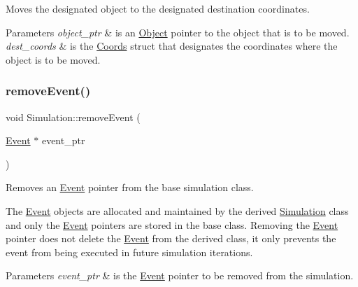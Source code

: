 Moves the designated object to the designated destination coordinates. 


\begin{DoxyParams}{Parameters}
{\em object\+\_\+ptr} & is an \hyperlink{class_object}{Object} pointer to the object that is to be moved. \\
\hline
{\em dest\+\_\+coords} & is the \hyperlink{struct_coords}{Coords} struct that designates the coordinates where the object is to be moved. \\
\hline
\end{DoxyParams}
\mbox{\label{class_simulation_a3a4808231d4760f0ab30ea39b6a67e8c}} 
\subsubsection{\texorpdfstring{remove\+Event()}{removeEvent()}}
{\footnotesize\ttfamily void Simulation\+::remove\+Event (\begin{DoxyParamCaption}\item[{\hyperlink{class_event}{Event} $\ast$}]{event\+\_\+ptr }\end{DoxyParamCaption})\hspace{0.3cm}{\ttfamily [protected]}}



Removes an \hyperlink{class_event}{Event} pointer from the base simulation class. 

The \hyperlink{class_event}{Event} objects are allocated and maintained by the derived \hyperlink{class_simulation}{Simulation} class and only the \hyperlink{class_event}{Event} pointers are stored in the base class. Removing the \hyperlink{class_event}{Event} pointer does not delete the \hyperlink{class_event}{Event} from the derived class, it only prevents the event from being executed in future simulation iterations. 
\begin{DoxyParams}{Parameters}
{\em event\+\_\+ptr} & is the \hyperlink{class_event}{Event} pointer to be removed from the simulation. \\
\hline
\end{DoxyParams}
\mbox{\label{class_simulation_a39da17feb9b487c05c9a834def44972f}} 
